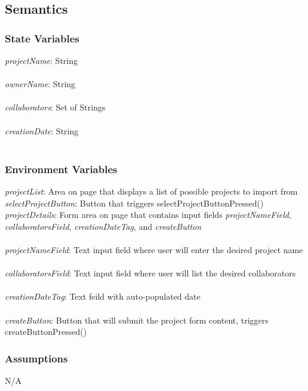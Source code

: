 \documentclass[12pt, titlepage]{article}
\begin{document}
	\subsection{Semantics}
	
	\subsubsection{State Variables}
	\textit{projectName}: String \\\\ 
	\textit{ownerName}: String \\\\ 
	\textit{collaborators}: Set of Strings \\\\
	\textit{creationDate}: String \\\\
	
	\subsubsection{Environment Variables}
	\textit{projectList}: Area on page that displays a list of possible projects to import from
	\textit{selectProjectButton}: Button that triggers selectProjectButtonPressed()
	\textit{projectDetails}: Form area on page that contains input fields \textit{projectNameField}, \textit{collaboratorsField}, \textit{creationDateTag}, and \textit{createButton}\\\\
	\textit{projectNameField}: Text input field where user will enter the desired project name\\\\ 
	\textit{collaboratorsField}: Text input field where user will list the desired collaborators\\\\
	\textit{creationDateTag}: Text feild with auto-populated date \\\\
	\textit{createButton}: Button that will submit the project form content, triggers createButtonPressed()
	
	\subsubsection{Assumptions}
	N/A
	
\end{document}
